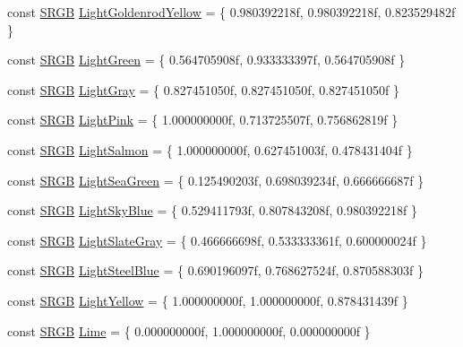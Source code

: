 \begin{DoxyCompactItemize}
\item 
const \hyperlink{structmage_1_1_s_r_g_b}{S\+R\+GB} \hyperlink{namespacemage_1_1color_a449666185e7f1aa661bf1e873d3d5660}{Light\+Goldenrod\+Yellow} = \{ 0.\+980392218f, 0.\+980392218f, 0.\+823529482f \}
\item 
const \hyperlink{structmage_1_1_s_r_g_b}{S\+R\+GB} \hyperlink{namespacemage_1_1color_a4bea2b8dc8f28cfabe9a9bc1c17d1f12}{Light\+Green} = \{ 0.\+564705908f, 0.\+933333397f, 0.\+564705908f \}
\item 
const \hyperlink{structmage_1_1_s_r_g_b}{S\+R\+GB} \hyperlink{namespacemage_1_1color_ad9a55cd211c48c9434a59a402f08f5f3}{Light\+Gray} = \{ 0.\+827451050f, 0.\+827451050f, 0.\+827451050f \}
\item 
const \hyperlink{structmage_1_1_s_r_g_b}{S\+R\+GB} \hyperlink{namespacemage_1_1color_abaad6ea2e021daadbf0c786fdc67d87c}{Light\+Pink} = \{ 1.\+000000000f, 0.\+713725507f, 0.\+756862819f \}
\item 
const \hyperlink{structmage_1_1_s_r_g_b}{S\+R\+GB} \hyperlink{namespacemage_1_1color_a83c81b20c0c848aa51e50c3c574468cd}{Light\+Salmon} = \{ 1.\+000000000f, 0.\+627451003f, 0.\+478431404f \}
\item 
const \hyperlink{structmage_1_1_s_r_g_b}{S\+R\+GB} \hyperlink{namespacemage_1_1color_a278937da295e5392f41da5c397c11974}{Light\+Sea\+Green} = \{ 0.\+125490203f, 0.\+698039234f, 0.\+666666687f \}
\item 
const \hyperlink{structmage_1_1_s_r_g_b}{S\+R\+GB} \hyperlink{namespacemage_1_1color_a1eadc5042ec89f5476bc00a34d35f08e}{Light\+Sky\+Blue} = \{ 0.\+529411793f, 0.\+807843208f, 0.\+980392218f \}
\item 
const \hyperlink{structmage_1_1_s_r_g_b}{S\+R\+GB} \hyperlink{namespacemage_1_1color_a6795688f07f23e699b7aff0ff67eff83}{Light\+Slate\+Gray} = \{ 0.\+466666698f, 0.\+533333361f, 0.\+600000024f \}
\item 
const \hyperlink{structmage_1_1_s_r_g_b}{S\+R\+GB} \hyperlink{namespacemage_1_1color_a83624532b875f86a965a0606e37c9c49}{Light\+Steel\+Blue} = \{ 0.\+690196097f, 0.\+768627524f, 0.\+870588303f \}
\item 
const \hyperlink{structmage_1_1_s_r_g_b}{S\+R\+GB} \hyperlink{namespacemage_1_1color_ad9ba3226f11cafb56cb192840ca950ce}{Light\+Yellow} = \{ 1.\+000000000f, 1.\+000000000f, 0.\+878431439f \}
\item 
const \hyperlink{structmage_1_1_s_r_g_b}{S\+R\+GB} \hyperlink{namespacemage_1_1color_a76b4ce58262d7b1391eb46d424be1828}{Lime} = \{ 0.\+000000000f, 1.\+000000000f, 0.\+000000000f \}

\end{DoxyCompactItemize}
